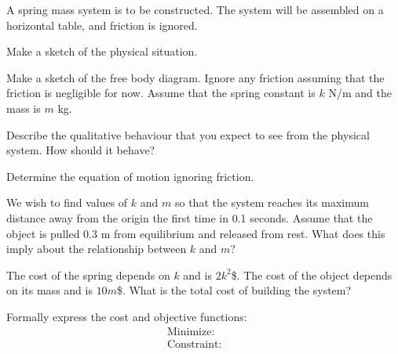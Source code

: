 \begin{problem}
\item A spring mass system is to be constructed. The system will be
  assembled on a horizontal table, and friction is ignored. 
  \begin{subproblem}
    \item Make a sketch of the physical situation.
      \vfill
    \item Make a sketch of the free body diagram. Ignore any friction
      assuming that the friction is negligible for now. Assume that
      the spring constant is $k$ N/m and the mass is $m$ kg.
      \vfill
    \item Describe the qualitative behaviour that you expect to see
      from the physical system. How should it behave?
      \vfill
    \item Determine the equation of motion ignoring friction.
      \vfill
  \end{subproblem}

  \clearpage

\item We wish to find values of $k$ and $m$ so that the system reaches
  its maximum distance away from the origin the first time in 0.1
  seconds. Assume that the object is pulled 0.3 m from equilibrium and
  released from rest. What does this imply about the relationship
  between $k$ and $m$?
  \vfill

  \clearpage

\item The cost of the spring depends on $k$ and is $2k^2$\$. The cost
  of the object depends on its mass and is $10m$\$. What is the total
  cost of building the system?

  \vfill

\item Formally express the cost and objective functions:
    \begin{eqnarray*}
      \mathrm{Minimize:} & &  \\
      \mathrm{Constraint:} & & 
    \end{eqnarray*}



\end{problem}

